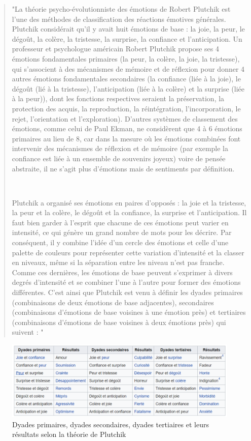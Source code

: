 \begin{quotation}

 "La théorie psycho-évolutionniste des émotions de Robert Plutchik \parencite{plutchik} est l'une des méthodes de classification des réactions émotives générales. Plutchik considérait qu'il y avait huit émotions de base : la joie, la peur, le dégoût, la colère, la tristesse, la surprise, la confiance et l'anticipation. Un professeur et psychologue américain Robert Plutchik propose ses 4 émotions fondamentales primaires (la peur, la colère, la joie, la tristesse), qui s'associent à des mécanismes de mémoire et de réflexion pour donner 4 autres émotions fondamentales secondaires (la confiance (liée à la joie), le dégoût (lié à la tristesse), l'anticipation (liée à la colère) et la surprise (liée à la peur)), dont les fonctions respectives seraient la préservation, la protection des acquis, la reproduction, la réintégration, l'incorporation, le rejet, l'orientation et l'exploration). D'autres systèmes de classement des émotions, comme celui de Paul Ekman, ne considèrent que 4 à 6 émotions primaires au lieu de 8, car dans la mesure où les émotions combinées font intervenir des mécanismes de réflexion et de mémoire (par exemple la confiance est liée à un ensemble de souvenirs joyeux) voire de pensée abstraite, il ne s'agit plus d'émotions mais de sentiments par définition.

~\par
Plutchik a organisé ses émotions en paires d'opposés : la joie et la tristesse, la peur et la colère, le dégoût et la confiance, la surprise et l'anticipation. Il faut bien garder à l'esprit que chacune de ces émotions peut varier en intensité, ce qui génère un grand nombre de mots pour les décrire. Par conséquent, il y combine l'idée d'un cercle des émotions et celle d'une palette de couleurs pour représenter cette variation d'intensité et la classer en niveaux, même si la séparation entre les niveau n'est pas franche. Comme ces dernières, les émotions de base peuvent s'exprimer à divers degrés d'intensité et se combiner l'une à l'autre pour former des émotions différentes. C'est ainsi que Plutchik est venu à définir les dyades primaires (combinaisons de deux émotions de base adjacentes), secondaires (combinaisons d'émotions de base voisines à une émotion près) et tertiaires (combinaisons d'émotions de base voisines à deux émotions près) qui suivent   \parencite{tayari2009modelisation} : "

\end{quotation}


\begin{figure}[th]
\hspace*{-1.9cm} 
\centering
\includegraphics{Figures/tableauEmotions.PNG}
\decoRule
\caption[Tableau de la théorie de Plutchik]{Dyades primaires, dyades secondaires, dyades tertiaires et leurs résultats selon la théorie de Plutchik}
\label{fig:TbEm}
\end{figure}




